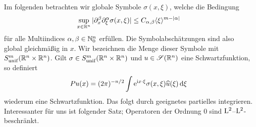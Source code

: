 Im folgenden betrachten wir globale Symbole $\sigma(x,\xi)$, welche die Bedingung
\begin{equation}
    \sup_{x\in\mathbb R^n} |\partial_x^\beta\partial_\xi^\alpha \sigma(x,\xi)| \le C_{\alpha,\beta} \langle\xi\rangle^{m-|\alpha|}
\end{equation}
für alle Multiindices $\alpha,\beta\in\mathbb N_0^n$ erfüllen. Die Symbolabschätzungen sind also global gleichmäßig in $x$.
Wir bezeichnen die Menge dieser Symbole mit $S^m_{\rm unif}(\mathbb R^n\times\mathbb R^n)$. Gilt $\sigma\in S^m_{\rm unif}(\mathbb R^n\times\mathbb R^n)$
und $u\in\mathscr S(\mathbb R^n)$ eine Schwartzfunktion, so definiert
\begin{equation}\label{eq:6:6.17}
   Pu (x) = (2\pi)^{-n/2} \int \mathrm e^{\mathrm i x\cdot\xi} \sigma(x,\xi) \widehat u(\xi)\,\mathrm d\xi
\end{equation}
wiederum eine Schwartzfunktion. Das folgt durch geeignetes partielles integrieren. Interessanter für uns ist folgender Satz; Operatoren der Ordnung $0$ sind $\mathrm L^2$--$\mathrm L^2$-beschränkt.
 
